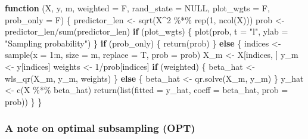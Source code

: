 \documentclass[
]{book}
\newenvironment{Shaded}{\begin{snugshade}}{\end{snugshade}}
\newcommand{\AttributeTok}[1]{\textcolor[rgb]{0.77,0.63,0.00}{#1}}
\newcommand{\ConstantTok}[1]{\textcolor[rgb]{0.00,0.00,0.00}{#1}}
\newcommand{\ControlFlowTok}[1]{\textcolor[rgb]{0.13,0.29,0.53}{\textbf{#1}}}
\newcommand{\DecValTok}[1]{\textcolor[rgb]{0.00,0.00,0.81}{#1}}
\newcommand{\FunctionTok}[1]{\textcolor[rgb]{0.00,0.00,0.00}{#1}}
\newcommand{\NormalTok}[1]{#1}
\newcommand{\OtherTok}[1]{\textcolor[rgb]{0.56,0.35,0.01}{#1}}
\newcommand{\SpecialCharTok}[1]{\textcolor[rgb]{0.00,0.00,0.00}{#1}}
\newcommand{\StringTok}[1]{\textcolor[rgb]{0.31,0.60,0.02}{#1}}
\begin{document}
\begin{Shaded}
\begin{Highlighting}[]
\ControlFlowTok{function}\NormalTok{ (X, y, m, }\AttributeTok{weighted =}\NormalTok{ F, }\AttributeTok{rand\_state =} \ConstantTok{NULL}\NormalTok{, }\AttributeTok{plot\_wgts =}\NormalTok{ F, }\AttributeTok{prob\_only =}\NormalTok{ F) }
\NormalTok{\{}
\NormalTok{    predictor\_len }\OtherTok{\textless{}{-}} \FunctionTok{sqrt}\NormalTok{(X}\SpecialCharTok{\^{}}\DecValTok{2} \SpecialCharTok{\%*\%} \FunctionTok{rep}\NormalTok{(}\DecValTok{1}\NormalTok{, }\FunctionTok{ncol}\NormalTok{(X)))}
\NormalTok{    prob }\OtherTok{\textless{}{-}}\NormalTok{ predictor\_len}\SpecialCharTok{/}\FunctionTok{sum}\NormalTok{(predictor\_len)}
    \ControlFlowTok{if}\NormalTok{ (plot\_wgts) \{}
        \FunctionTok{plot}\NormalTok{(prob, }\AttributeTok{t =} \StringTok{"l"}\NormalTok{, }\AttributeTok{ylab =} \StringTok{"Sampling probability"}\NormalTok{)}
\NormalTok{    \}}
    \ControlFlowTok{if}\NormalTok{ (prob\_only) \{}
        \FunctionTok{return}\NormalTok{(prob)}
\NormalTok{    \}}
    \ControlFlowTok{else}\NormalTok{ \{}
\NormalTok{        indices }\OtherTok{\textless{}{-}} \FunctionTok{sample}\NormalTok{(}\AttributeTok{x =} \DecValTok{1}\SpecialCharTok{:}\NormalTok{n, }\AttributeTok{size =}\NormalTok{ m, }\AttributeTok{replace =}\NormalTok{ T, }\AttributeTok{prob =}\NormalTok{ prob)}
\NormalTok{        X\_m }\OtherTok{\textless{}{-}}\NormalTok{ X[indices, ]}
\NormalTok{        y\_m }\OtherTok{\textless{}{-}}\NormalTok{ y[indices]}
\NormalTok{        weights }\OtherTok{\textless{}{-}} \DecValTok{1}\SpecialCharTok{/}\NormalTok{prob[indices]}
        \ControlFlowTok{if}\NormalTok{ (weighted) \{}
\NormalTok{            beta\_hat }\OtherTok{\textless{}{-}} \FunctionTok{wls\_qr}\NormalTok{(X\_m, y\_m, weights)}
\NormalTok{        \}}
        \ControlFlowTok{else}\NormalTok{ \{}
\NormalTok{            beta\_hat }\OtherTok{\textless{}{-}} \FunctionTok{qr.solve}\NormalTok{(X\_m, y\_m)}
\NormalTok{        \}}
\NormalTok{        y\_hat }\OtherTok{\textless{}{-}} \FunctionTok{c}\NormalTok{(X }\SpecialCharTok{\%*\%}\NormalTok{ beta\_hat)}
        \FunctionTok{return}\NormalTok{(}\FunctionTok{list}\NormalTok{(}\AttributeTok{fitted =}\NormalTok{ y\_hat, }\AttributeTok{coeff =}\NormalTok{ beta\_hat, }\AttributeTok{prob =}\NormalTok{ prob))}
\NormalTok{    \}}
\NormalTok{\}}
\end{Highlighting}
\end{Shaded}

\hypertarget{a-note-on-optimal-subsampling-opt}{%
\subsubsection{A note on optimal subsampling (OPT)}\label{a-note-on-optimal-subsampling-opt}}
\end{document}
